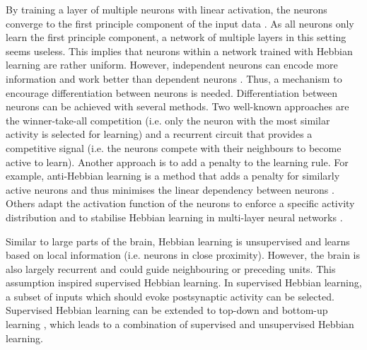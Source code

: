 By training a layer of multiple neurons with linear activation, the neurons converge to the first principle component of the input data \cite{Oja_1982}.
As all neurons only learn the first principle component, a network of multiple layers in this setting seems useless. This implies that neurons within a network trained with Hebbian learning are rather uniform.
However, independent neurons can encode more information and work better than dependent neurons .
Thus, a mechanism to encourage differentiation between neurons is needed.
Differentiation between neurons can be achieved with several methods.
Two well-known approaches are the winner-take-all competition (i.e. only the neuron with the most similar activity is selected for learning) and a recurrent circuit that provides a competitive signal (i.e. the neurons compete with their neighbours to become active to learn).
Another approach is to add a penalty to the learning rule.
For example, anti-Hebbian learning is a method that adds a penalty for similarly active neurons and thus minimises the linear dependency between neurons .
Others adapt the activation function of the neurons to enforce a specific activity distribution and to stabilise Hebbian learning in multi-layer neural networks .

Similar to large parts of the brain, Hebbian learning is unsupervised and learns based on local information (i.e. neurons in close proximity).
However, the brain is also largely recurrent and could guide neighbouring or preceding units.
This assumption inspired supervised Hebbian learning.
In supervised Hebbian learning, a subset of inputs which should evoke postsynaptic activity can be selected.
Supervised Hebbian learning can be extended to top-down and bottom-up learning , which leads to a combination of supervised and unsupervised Hebbian learning.











